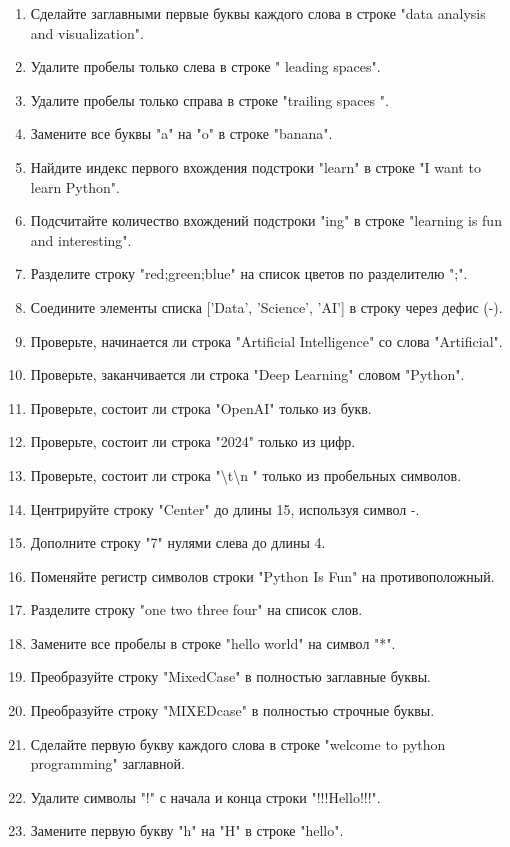 \documentclass[a4,12pt]{article}
\theoremstyle{remark}
\begin{document}
\begin{enumerate}
    \item Сделайте заглавными первые буквы каждого слова в строке "data analysis and visualization".
    \item Удалите пробелы только слева в строке " leading spaces".
    \item Удалите пробелы только справа в строке "trailing spaces ".
    \item Замените все буквы "a" на "o" в строке "banana".
    \item Найдите индекс первого вхождения подстроки "learn" в строке "I want to learn Python".
    \item Подсчитайте количество вхождений подстроки "ing" в строке "learning is fun and interesting".
    \item Разделите строку "red;green;blue" на список цветов по разделителю ";".
    \item Соедините элементы списка ['Data', 'Science', 'AI'] в строку через дефис (-).
    \item Проверьте, начинается ли строка "Artificial Intelligence" со слова "Artificial".
    \item Проверьте, заканчивается ли строка "Deep Learning" словом "Python".
    \item Проверьте, состоит ли строка "OpenAI" только из букв.
    \item Проверьте, состоит ли строка "2024" только из цифр.
    \item Проверьте, состоит ли строка "\textbackslash t\textbackslash n " только из пробельных символов.
    \item Центрируйте строку "Center" до длины 15, используя символ -.
    \item Дополните строку "7" нулями слева до длины 4.
    \item Поменяйте регистр символов строки "Python Is Fun" на противоположный.
    \item Разделите строку "one two three four" на список слов.
    \item Замените все пробелы в строке "hello world" на символ "*".
    \item Преобразуйте строку "MixedCase" в полностью заглавные буквы.
    \item Преобразуйте строку "MIXEDcase" в полностью строчные буквы.
    \item Сделайте первую букву каждого слова в строке "welcome to python programming" заглавной.
    \item Удалите символы "!" с начала и конца строки "!!!Hello!!!".
    \item Замените первую букву "h" на "H" в строке "hello".

\end{enumerate}
\end{document}
